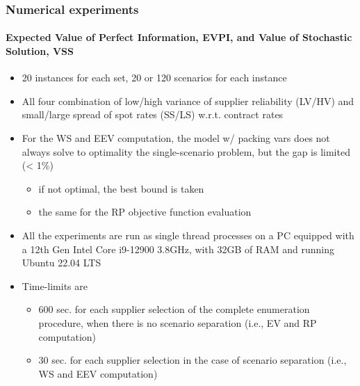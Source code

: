 \documentclass[9pt,xcolor={dvipsnames}]{beamer}
\begin{document}
\begin{frame}[allowframebreaks]
	\frametitle{Numerical experiments}
	\framesubtitle{Expected Value of Perfect Information, EVPI, and Value of Stochastic Solution, VSS}
	\begin{itemize}
		\footnotesize
		\item 20 instances for each set, 20 or 120 scenarios for each instance
		\bigskip
		\item All four combination of low/high variance of supplier reliability (LV/HV) and small/large spread of spot rates (SS/LS) w.r.t. contract rates
		\bigskip
		\item For the WS and EEV computation, the model w/ packing vars does not always solve to optimality the single-scenario problem, but the gap is limited (< 1\%)
		\begin{itemize}
			\item if not optimal, the best bound is taken
			\item the same for the RP objective function evaluation
		\end{itemize}
		\bigskip
		\item All the experiments are run as single thread processes on a PC equipped with a 12th Gen Intel Core i9-12900 3.8GHz, with 32GB of RAM and running Ubuntu 22.04 LTS
		\bigskip
		\item Time-limits are
		\begin{itemize}
			\item 600 sec. for each supplier selection of the complete enumeration procedure, when there is no scenario separation (i.e., EV and RP computation)
			\item  30 sec. for each supplier selection in the case of scenario separation (i.e., WS and EEV computation)
		\end{itemize}
	\end{itemize}
\end{frame}
\end{document}
